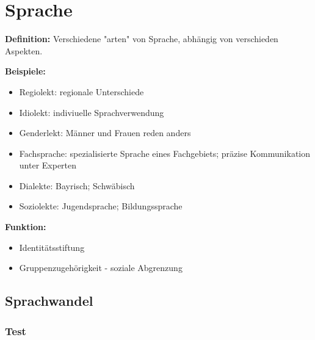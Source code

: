
\section{Sprache}

\textbf{Definition:} 
Verschiedene "arten" von Sprache, abhängig von verschieden Aspekten.

\textbf{Beispiele:}
\begin{itemize}
    \item Regiolekt: regionale Unterschiede
    \item Idiolekt: indiviuelle Sprachverwendung
    \item Genderlekt: Männer und Frauen reden anders
    \item Fachsprache: spezialisierte Sprache eines Fachgebiets; präzise Kommunikation unter Experten
    \item Dialekte: Bayrisch; Schwäbisch
    \item Soziolekte: Jugendsprache; Bildungssprache
\end{itemize}

\textbf{Funktion:}
\begin{itemize}
    \item Identitätsstiftung
    \item Gruppenzugehörigkeit - soziale Abgrenzung
\end{itemize}


\subsection{Sprachwandel}


\subsubsection{Test}

